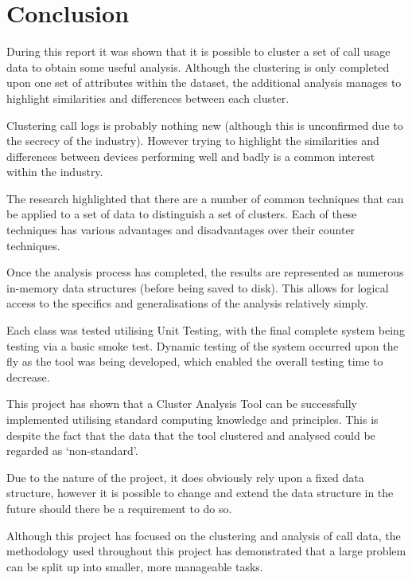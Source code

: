 \chapter{Conclusion}
\label{cha:conclusion}

During this report it was shown that it is possible to cluster a set of call 
usage data to obtain some useful analysis. Although the clustering is only 
completed upon one set of attributes within the dataset, the additional 
analysis manages to highlight similarities and differences between each 
cluster.

Clustering call logs is probably nothing new (although this is unconfirmed due
to the secrecy of the industry). However trying to highlight the similarities 
and differences between devices performing well and badly is a common interest 
within the industry.

The research highlighted that there are a number of common techniques that can 
be applied to a set of data to distinguish a set of clusters. Each of these 
techniques has various advantages and disadvantages over their counter 
techniques.

Once the analysis process has completed, the results are represented as 
numerous in-memory data structures (before being saved to disk). This allows 
for logical access to the specifics and generalisations of the analysis 
relatively simply.

Each class was tested utilising Unit Testing, with the final complete system 
being testing via a basic smoke test. Dynamic testing of the system occurred 
upon the fly as the tool was being developed, which enabled the overall testing
time to decrease.

This project has shown that a Cluster Analysis Tool can be successfully 
implemented utilising standard computing knowledge and principles. This is 
despite the fact that the data that the tool clustered and analysed could be 
regarded as `non-standard'.

Due to the nature of the project, it does obviously rely upon a fixed data 
structure, however it is possible to change and extend the data structure in 
the future should there be a requirement to do so.

Although this project has focused on the clustering and analysis of call data, 
the methodology used throughout this project has demonstrated that a large 
problem can be split up into smaller, more manageable tasks.
